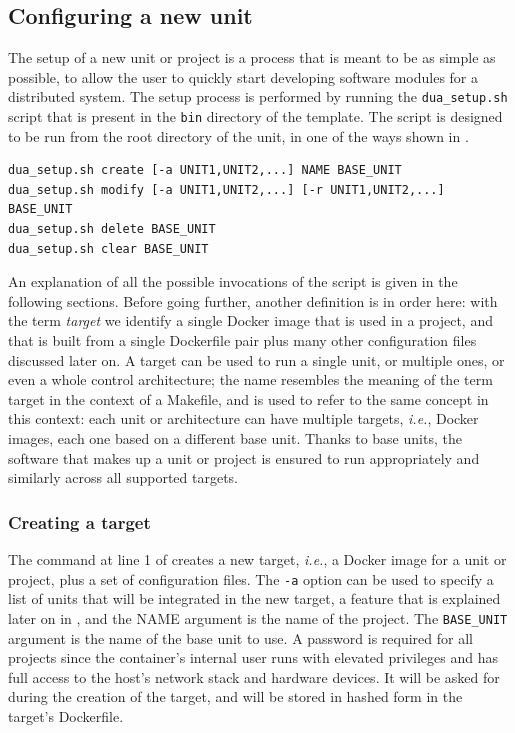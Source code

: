\subsection{Configuring a new unit}
\label{sec:dua_template_configuration}
The setup of a new unit or project is a process that is meant to be as simple as possible, to allow the user to quickly start developing software modules for a distributed system. The setup process is performed by running the \texttt{dua\_setup.sh} script that is present in the \texttt{bin} directory of the template. The script is designed to be run from the root directory of the unit, in one of the ways shown in .
\begin{center}
\begin{minipage}[t]{.9\textwidth}
\begin{lstlisting}[caption=Possible invocations of the \texttt{dua\_setup.sh} script., label={lst:duasetup}]
dua_setup.sh create [-a UNIT1,UNIT2,...] NAME BASE_UNIT
dua_setup.sh modify [-a UNIT1,UNIT2,...] [-r UNIT1,UNIT2,...] BASE_UNIT
dua_setup.sh delete BASE_UNIT
dua_setup.sh clear BASE_UNIT
\end{lstlisting}
\end{minipage}
\end{center}
An explanation of all the possible invocations of the script is given in the following sections. Before going further, another definition is in order here: with the term \emph{target} we identify a single Docker image that is used in a project, and that is built from a single Dockerfile pair plus many other configuration files discussed later on. A target can be used to run a single unit, or multiple ones, or even a whole control architecture; the name resembles the meaning of the term target in the context of a Makefile, and is used to refer to the same concept in this context: each unit or architecture can have multiple targets, \emph{i.e.}, Docker images, each one based on a different base unit. Thanks to base units, the software that makes up a unit or project is ensured to run appropriately and similarly across all supported targets.

\subsubsection{Creating a target}
\label{sec:dua_template_configuration_create}
The command at line 1 of  creates a new target, \emph{i.e.}, a Docker image for a unit or project, plus a set of configuration files. The \texttt{-a} option can be used to specify a list of units that will be integrated in the new target, a feature that is explained later on in , and the NAME argument is the name of the project. The \texttt{BASE\_UNIT} argument is the name of the base unit to use. A password is required for all projects since the container's internal user runs with elevated privileges and has full access to the host's network stack and hardware devices. It will be asked for during the creation of the target, and will be stored in hashed form in the target's Dockerfile.

